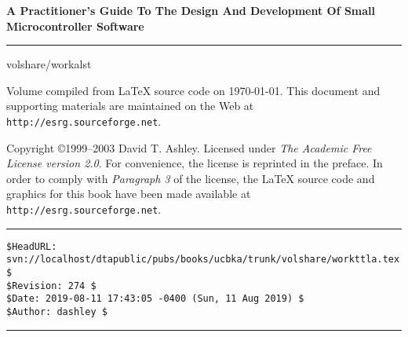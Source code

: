 
\thispagestyle{empty}

\begin{flushright}
\huge\bfseries
A Practitioner's Guide To The
Design And Development Of
Small Microcontroller Software
\end{flushright}
\vspace{0.0cm}
\noindent\rule{\textwidth}{2pt}
\begin{flushright}
\huge\bfseries
\curvoltitlepageprefix{}\curvolroman{}\curvoltitlepagesep{}\curvoltitle{}
\end{flushright}
\vfill
\begin{flushright}
\begin{small}
 {volshare/workalst}
\end{small}
\end{flushright}
\vspace{0.2cm}
\begin{flushright}
\begin{small}
Volume compiled from \LaTeX{} source code on \today .  
This document and supporting materials
are maintained on the Web at \texttt{http://esrg.sourceforge.net}.
\end{small}
\end{flushright}

\pagebreak
\thispagestyle{empty}
\begin{small}
  \noindent Copyright \copyright 1999--2003 David T. Ashley.
  Licensed under \emph{The Academic Free License version 2.0}.
  For convenience, the license is reprinted in the preface.
  In order to comply with \emph{Paragraph 3} of the license,
  the \LaTeX{} source code and graphics for this book have
  been made available at \texttt{http://esrg.sourceforge.net}.
\end{small}

\vfill

\noindent\begin{minipage}{\textwidth}
\noindent\rule[-0.25in]{\textwidth}{1pt}
\begin{tiny}
\begin{verbatim}
$HeadURL: svn://localhost/dtapublic/pubs/books/ucbka/trunk/volshare/workttla.tex $
$Revision: 274 $
$Date: 2019-08-11 17:43:05 -0400 (Sun, 11 Aug 2019) $
$Author: dashley $
\end{verbatim}
\end{tiny}
\noindent\rule[0.25in]{\textwidth}{1pt}
\end{minipage}
%
